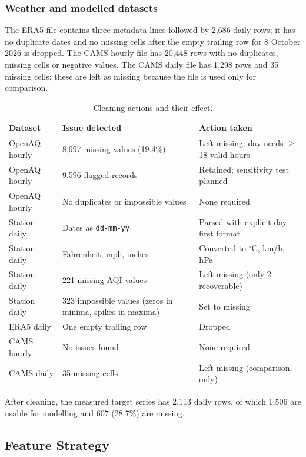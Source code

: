 \subsubsection{Weather and modelled datasets}

The ERA5 file contains three metadata lines followed by 2{,}686 daily rows; it has no duplicate dates and no missing cells after the empty trailing row for 8 October 2026 is dropped. The CAMS hourly file has 20{,}448 rows with no duplicates, missing cells or negative values. The CAMS daily file has 1{,}298 rows and 35 missing cells; these are left as missing because the file is used only for comparison.

\begin{table}[htbp]
\centering
\footnotesize
\begin{tabular}{@{}L{2.8cm}L{5.2cm}L{5.0cm}@{}}
\toprule
\textbf{Dataset} & \textbf{Issue detected} & \textbf{Action taken} \\
\midrule
OpenAQ hourly & 8{,}997 missing values (19.4\%) & Left missing; day needs $\geq$18 valid hours \\
OpenAQ hourly & 9{,}596 flagged records & Retained; sensitivity test planned \\
OpenAQ hourly & No duplicates or impossible values & None required \\
Station daily & Dates as \texttt{dd-mm-yy} & Parsed with explicit day-first format \\
Station daily & Fahrenheit, mph, inches & Converted to $^\circ$C, km/h, hPa \\
Station daily & 221 missing AQI values & Left missing (only 2 recoverable) \\
Station daily & 323 impossible values (zeros in minima, spikes in maxima) & Set to missing \\
ERA5 daily & One empty trailing row & Dropped \\
CAMS hourly & No issues found & None required \\
CAMS daily & 35 missing cells & Left missing (comparison only) \\
\bottomrule
\end{tabular}
\caption{Cleaning actions and their effect.}
\label{tab:cleaning}
\end{table}

After cleaning, the measured target series has 2{,}113 daily rows, of which 1{,}506 are usable for modelling and 607 (28.7\%) are missing.

\subsection{Feature Strategy}
\label{sec:features}

